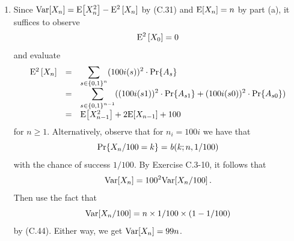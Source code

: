 \begin{enumerate}[\thechapter-1]
\begin{enumerate}[\it a.]
Let $X_n$ denote the value represented by the counter after $n$  operations have been performed. The claim can then be proved by induction on $0 \leq n \leq 2^b - 1$: The base case is trivial. For the inductive case, let $1 \leq n \leq 2^b - 1$, we have
\[
\begin{array}{lll}
\ex{X_n} & = & \ds{\sum_{s \in \cartpwr{\sete{0, 1}}{n}} n_{i(s)} \multp \pr{A_s}} \cr
         & = & \ds{\sum_{s \in \cartpwr{\sete{0, 1}}{n - 1}} (n_{i(s1)} \multp \pr{A_{s1}} + n_{i(s0)} \multp \pr{A_{s0}})} \cr
         & = & \ds{\sum_{s \in \cartpwr{\sete{0, 1}}{n - 1}} (n_{i(s) + 1} \multp \pr{A_{s1}} + n_{i(s)} \multp \pr{A_{s0}})} \cr
         & = & \ds{\sum_{s \in \cartpwr{\sete{0, 1}}{n - 1}} (n_{i(s) + 1} \multp \pr{A'_s} \multp \pr{B_n \given A'_s} + n_{i(s)} \multp \pr{A'_s} \multp (1 - \pr{B_n \given A'_s}))} \cr
         & = & \ds{\sum_{s \in \cartpwr{\sete{0, 1}}{n - 1}} (n_{i(s)} \multp \pr{A'_s} + (n_{i(s) + 1} - n_{i(s)}) \multp \pr{A'_s} \multp \pr{B_n \given A'_s})} \cr
         & = & \ds{\sum_{s \in \cartpwr{\sete{0, 1}}{n - 1}} (n_{i(s)} \multp \pr{A_s} + (n_{i(s) + 1} - n_{i(s)}) \multp \pr{A_s} \multp \pr{B_n \given A'_s})} \cr
         & = & \ds{\sum_{s \in \cartpwr{\sete{0, 1}}{n - 1}} (n_{i(s)} \multp \pr{A_s} + \pr{A_s})} \cr
         & = & \ds{\sum_{s \in \cartpwr{\sete{0, 1}}{n - 1}} (n_{i(s)} \multp \pr{A_s}) + \sum_{s \in \cartpwr{\sete{0, 1}}{n - 1}} \pr{A_s}} \cr
         & = & \ex{X_{n - 1}} + 1 \cr
         & = & (n - 1) + 1 \cr
         & = & n, \cr
\end{array}
\]
where the second last equality follows by induction hypothesis.
\item Since $\mathrm{Var}\!\left[X_n\right] = \mathrm{E}\!\left[X_n^2\right] - \mathrm{E}^2\left[X_n\right]$ by (C.31) and $\mathrm{E}\!\left[X_n\right] = n$ by part (a), it suffices to observe
\[
\mathrm{E}^2\left[X_0\right] = 0
\]
and evaluate
\[
\begin{array}{lll}
\mathrm{E}^2\left[X_n\right] & = & {\displaystyle\sum_{s \in \left\{0, 1\right\}^{n}} (100i(s))^2 \cdot \Pr\!\left\{A_s\right\}} \cr
            & = & {\displaystyle\sum_{s \in \left\{0, 1\right\}^{n - 1}} ((100i(s1))^2 \cdot \Pr\!\left\{A_{s1}\right\} + (100i(s0))^2 \cdot \Pr\!\left\{A_{s0}\right\})} \cr
            & = & \mathrm{E}\!\left[X_{n - 1}^2\right] + 2 \mathrm{E}\!\left[X_{n - 1}\right] + 100 \cr
\end{array}
\]
for $n \geq 1$. Alternatively, observe that for $n_i = 100i$ we have that
\[
\Pr\!\left\{X_n / 100 = k\right\} = \mathit{b}(k; n, 1/100)
\]
with the chance of success $1/100$. By Exercise C.3-10, it follows that
\[
\mathrm{Var}\!\left[X_n\right] = 100^2 \mathrm{Var}\!\left[X_n / 100\right].
\]
Then use the fact that
\[
\mathrm{Var}\!\left[X_n / 100\right] = n \times 1/100 \times (1 - 1/100)
\]
by (C.44). Either way, we get $\mathrm{Var}\!\left[X_n\right] = 99n$.

\end{enumerate}
\end{enumerate}
